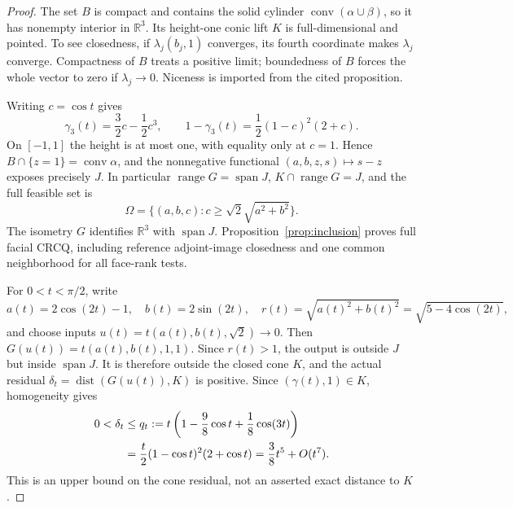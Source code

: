 \documentclass[11pt]{article}
\numberwithin{equation}{section}
\theoremstyle{definition}
\theoremstyle{remark}
\DeclareMathOperator{\dist}{dist}
\DeclareMathOperator{\spann}{span}
\DeclareMathOperator{\range}{range}
\DeclareMathOperator{\conv}{conv}
\newcommand{\R}{\mathbb R}
\newcommand{\dset}[2]{\dist(#1,#2)}
\begin{document}
\begin{proof}
The set $B$ is compact and contains the solid cylinder
$\conv(\alpha\cup\beta)$, so it has nonempty interior in $\R^3$.
Its height-one conic lift $K$ is full-dimensional and pointed. To see
closedness, if $\lambda_j(b_j,1)$ converges, its fourth coordinate
makes $\lambda_j$ converge. Compactness of $B$ treats a positive limit;
boundedness of $B$ forces the whole vector to zero if $\lambda_j\to0$.
Niceness is imported from the cited proposition.

Writing $c=\cos t$ gives
\[
 \gamma_3(t)=\frac32c-\frac12c^3,
 \qquad 1-\gamma_3(t)=\frac12(1-c)^2(2+c).
\]
On $[-1,1]$ the height is at most one, with equality only at $c=1$.
Hence $B\cap\{z=1\}=\conv\alpha$, and the nonnegative functional
$(a,b,z,s)\mapsto s-z$ exposes precisely $J$.
In particular $\range G=\spann J$, $K\cap\range G=J$, and the full
feasible set is
\begin{equation}
 \Omega=\{(a,b,c):c\geq\sqrt2\sqrt{a^2+b^2}\}.
 \label{eq:lrs-feasible}
\end{equation}
The isometry $G$ identifies $\R^3$ with $\spann J$.
Proposition~\ref{prop:inclusion} proves full facial CRCQ, including
reference adjoint-image closedness and one common neighborhood for all
face-rank tests.

For $0<t<\pi/2$, write
\[
 a(t)=2\cos(2t)-1,\quad b(t)=2\sin(2t),\quad
 r(t)=\sqrt{a(t)^2+b(t)^2}=\sqrt{5-4\cos(2t)},
\]
and choose inputs
$u(t)=t(a(t),b(t),\sqrt2)\to0$. Then
$G(u(t))=t(a(t),b(t),1,1)$.
Since $r(t)>1$, the output is outside $J$ but inside $\spann J$.
It is therefore outside the closed cone $K$, and the actual residual
$\delta_t=\dset{G(u(t))}{K}$ is positive.
Since $(\gamma(t),1)\in K$, homogeneity gives
\begin{align}
 0<\delta_t
 &\leq q_t:=t\left(1-\frac98\cos t+\frac18\cos(3t)\right)\notag\\
 &=\frac{t}{2}(1-\cos t)^2(2+\cos t)
 =\frac38t^5+O(t^7).
 \label{eq:small-residual}
\end{align}
This is an upper bound on the cone residual, not an asserted exact
distance to $K$.


\end{proof}
\end{document}

